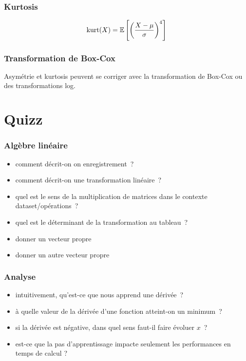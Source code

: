 \documentclass{formation}
\begin{document}
\begin{frame}
  \frametitle{Kurtosis}


  \[
    \kurt(X) = \mathbb{E} \left[\left(\frac{X - \mu}{\sigma}\right)^4\right]
  \]
\end{frame}

\begin{frame}
  \frametitle{Transformation de Box-Cox}
  Asymétrie et kurtosis peuvent se corriger avec la transformation de
  Box-Cox ou des transformations log.
\end{frame}

\section{Quizz}

\begin{frame}
  \frametitle{Algèbre linéaire}

  \begin{itemize}[<+->]
  \item comment décrit-on on enregistrement ?
  \item comment décrit-on une transformation linéaire ?
  \item quel est le sens de la multiplication de matrices dans le
    contexte dataset/opérations ?
  \item quel est le déterminant de la transformation au tableau ?
  \item donner un vecteur propre
  \item donner un autre vecteur propre
  \end{itemize}
\end{frame}

\begin{frame}
  \frametitle{Analyse}

  \begin{itemize}[<+->]
  \item intuitivement, qu'est-ce que nous apprend une dérivée ?
  \item à quelle valeur de la dérivée d'une fonction atteint-on un
    minimum ?
  \item si la dérivée est négative, dans quel sens faut-il faire
    évoluer $x$ ?
  \item est-ce que la pas d'apprentissage impacte seulement les
    performances en temps de calcul ?
  \end{itemize}
\end{frame}
\end{document}
